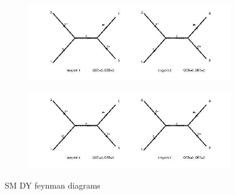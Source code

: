 \documentclass{CUP-JNL-DTM}%
\theoremstyle{definition}
\numberwithin{equation}{section}
\begin{document}
\begin{figure}[H]
    \begin{subfigure}{.5\textwidth}
      \centering
      \includegraphics[width=1.1\linewidth]{img/dy_sm_diagrams.jpg}
      \label{fig:sm_dy1}
    \end{subfigure}%
    \begin{subfigure}{.5\textwidth}
      \centering
      \includegraphics[width=1.1\linewidth]{img/dy2_sm_diagrams.jpg}
      \label{fig:sm_dy2}
    \end{subfigure}
    \caption{SM DY feynman diagrams}
    \label{fig:sm_dy}
\end{figure}
\end{document}
